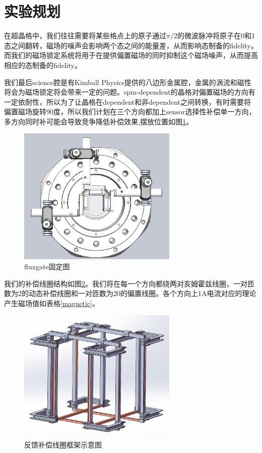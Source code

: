 \documentclass[onecolumn,a4paper,10pt]{article}
\begin{document}
\section{实验规划}
在超晶格中，我们往往需要将某些格点上的原子通过$\pi/2$的微波脉冲将原子在0和1态之间翻转，磁场的噪声会影响两个态之间的能量差，从而影响态制备的fidelity。而我们的磁场锁定系统将用于在提供偏置磁场的同时抑制这个磁场噪声，从而提高相应的态制备的fidelity。

我们最后science腔是有Kimball Physics提供的八边形金属腔，金属的涡流和磁性将会为磁场锁定将会带来一定的问题。spin-dependent的晶格对偏置磁场的方向有一定依耐性，所以为了让晶格在dependent和非dependent之间转换，有时需要将偏置磁场旋转90度，所以我们计划在三个方向都加上sensor选择性补偿单一方向，多方向同时补可能会导致竞争降低补偿效果,摆放位置如图\ref{place}。

\begin{figure}[htbp]
\centering
\includegraphics[width=3in]{sensorplace}
\caption{fluxgate固定图}
\label{place}
\end{figure}

我们的补偿线圈结构如图\ref{frame}。我们将在每一个方向都绕两对亥姆霍兹线圈，一对匝数为2的动态补偿线圈和一对匝数为20的偏置线圈。各个方向上1A电流对应的理论产生磁场值如表格\ref{magnetic}。

\begin{figure}[htbp]
\centering
\includegraphics[width=3in]{磁补偿frame}
\caption{反馈补偿线圈框架示意图}
\label{frame}
\end{figure}
\end{document}
